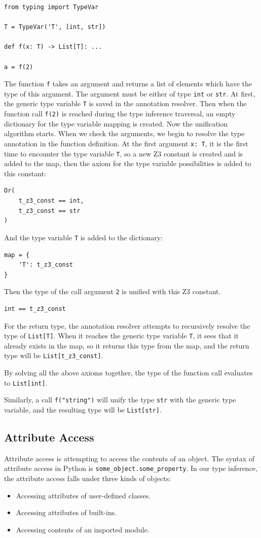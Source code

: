 \begin{lstlisting}
from typing import TypeVar

T = TypeVar('T', [int, str])

def f(x: T) -> List[T]: ...

a = f(2)
\end{lstlisting}

The function \lstinline|f| takes an argument and returns a list of elements which have the type of this argument. The argument must be either of type \lstinline|int| or \lstinline|str|. At first, the generic type variable \lstinline|T| is saved in the annotation resolver. Then when the function call \lstinline|f(2)| is reached during the type inference traversal, an empty dictionary for the type variable mapping is created. Now the unification algorithm starts. When we check the arguments, we begin to resolve the type annotation in the function definition. At the first argument \lstinline|x: T|, it is the first time to encounter the type variable \lstinline|T|, so a new Z3 constant is created and is added to the map, then the axiom for the type variable possibilities is added to this constant:
\begin{lstlisting}
Or(
	t_z3_const == int,
	t_z3_const == str
)
\end{lstlisting}
And the type variable \lstinline|T| is added to the dictionary:
\begin{lstlisting}
map = {
	'T': t_z3_const
}
\end{lstlisting}
Then the type of the call argument \lstinline|2| is unified with this Z3 constant.
\begin{lstlisting}
int == t_z3_const
\end{lstlisting}

For the return type, the annotation resolver attempts to recursively resolve the type of \lstinline|List[T]|. When it reaches the generic type variable \lstinline|T|, it sees that it already exists in the map, so it returns this type from the map, and the return type will be \lstinline|List[t_z3_const]|.

By solving all the above axioms together, the type of the function call evaluates to \lstinline|List[int]|.

Similarly, a call \lstinline|f("string")| will unify the type \lstinline|str| with the generic type variable, and the resulting type will be \lstinline|List[str]|.\\ 
\subsection{Attribute Access}
Attribute access is attempting to access the contents of an object. The syntax of attribute access in Python is \lstinline|some_object.some_property|. In our type inference, the attribute access falls under three kinds of objects:
\begin{itemize}
	\item Accessing attributes of user-defined classes.
	\item Accessing attributes of built-ins.
	\item Accessing contents of an imported module.
\end{itemize}


